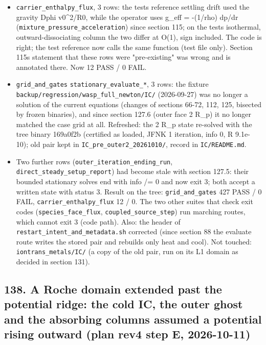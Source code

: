 \documentclass[english,a4paper]{my_memo}
\providecommand{\tightlist}{\setlength{\itemsep}{0pt}\setlength{\parskip}{0pt}}
\begin{document}
\begin{itemize}
\tightlist
\item
  \texttt{carrier\_enthalpy\_flux}, 3 rows: the test\textquotesingle s reference settling drift used
  the gravity Dphi v0\^{}2/R0, while the operator uses g\_eff = -(1/rho) dp/dr
  (\texttt{mixture\_pressure\_acceleration}) since section 115; on the test\textquotesingle s isothermal,
  outward-dissociating column the two differ at O(1), sign included. The code
  is right; the test reference now calls the same function (test file only).
  Section 115\textquotesingle s statement that these rows were "pre-existing" was wrong and is
  annotated there. Now 12 PASS / 0 FAIL.
\item
  \texttt{grid\_and\_gates} \texttt{stationary\_evaluate\_*}, 3 rows: the fixture
  \texttt{backup/regression/wasp\_full\_newton/IC/} (2026-09-27) was no longer a solution
  of the current equations (changes of sections 66-72, 112, 125, bisected by
  frozen binaries), and since section 127.6 (outer face 2 R\_p) it no longer
  matched the case grid at all. Refreshed: the 2 R\_p state re-solved with the
  tree binary 169a0f2b (certified as loaded, JFNK 1 iteration, info 0,
  \textbar\textbar R\textbar\textbar{} 9.1e-10); old pair kept in \texttt{IC\_pre\_outer2\_20261010/}, record in
  \texttt{IC/README.md}.
\item
  Two further rows (\texttt{outer\_iteration\_ending\_run}, \texttt{direct\_steady\_setup\_report})
  had become stale with section 127.5: their bounded stationary solves end with
  info /= 0 and now exit 3; both accept a written state with status 3.
  Result on the tree: \texttt{grid\_and\_gates} 427 PASS / 0 FAIL, \texttt{carrier\_enthalpy\_flux}
  12 / 0. The two other suites that check exit codes (\texttt{species\_face\_flux},
  \texttt{coupled\_source\_step}) run marching routes, which cannot exit 3 (code path).
  Also: the header of \texttt{restart\_intent\_and\_metadata.sh} corrected (since section 88
  the evaluate route writes the stored pair and rebuilds only heat and cool).
  Not touched: \texttt{iontrans\_metals/IC/} (a copy of the old pair, run on its L1 domain
  as decided in section 131).
\end{itemize}

\subsection{138. A Roche domain extended past the potential ridge: the cold IC, the outer ghost and the absorbing columns assumed a potential rising outward (plan rev4 step E, 2026-10-11)}\label{138-a-roche-domain-extended-past-the-potential-ridge-the-cold-ic-the-outer-ghost-and-the-absorbing-columns-assumed-a-potential-rising-outward-plan-rev4-step-e-2026-10-11}
\end{document}
